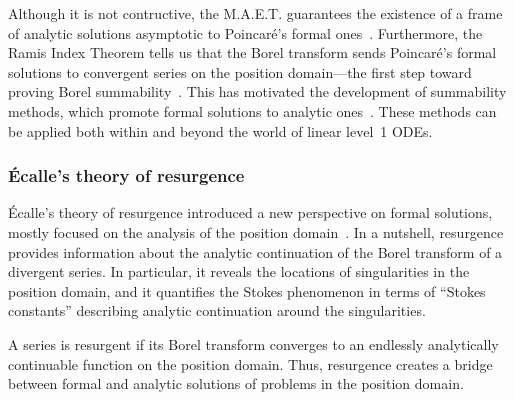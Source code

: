 \documentclass{article}
\newcommand{\series}[1]{\tilde{#1}}
\theoremstyle{definition}
\theoremstyle{plain}
\begin{document}
Although it is not contructive, the M.A.E.T. guarantees the existence of a frame of analytic solutions asymptotic to Poincar\'{e}'s formal ones~\cite[Chapter~14]{balser}. Furthermore, the Ramis Index Theorem tells us that the Borel transform sends Poincar\'{e}'s formal solutions to convergent series on the position domain---the first step toward proving Borel summability~\cite{ramis_index}. This has motivated the development of summability methods, which promote formal solutions to analytic ones~\cite{diverg-resurg--ii,malgrange--fourier,malgrange1995sommation,malgrange92,ramis1991series}. These methods can be applied both within and beyond the world of linear level~1 ODEs.

\subsubsection{\'{E}calle's theory of resurgence}
\'{E}calle's theory of resurgence introduced a new perspective on formal solutions, mostly focused on the analysis of the position domain~\cite{EcalleIII,loday-Remy2011}. In a nutshell, resurgence provides information about the analytic continuation of the Borel transform of a divergent series. In particular, it reveals the locations of singularities in the position domain, and it quantifies the Stokes phenomenon in terms of ``Stokes constants'' describing analytic continuation around the singularities.

A series is resurgent if its Borel transform converges to an endlessly analytically continuable function on the position domain. Thus, resurgence creates a bridge between formal and analytic solutions of problems in the position domain.
\end{document}
